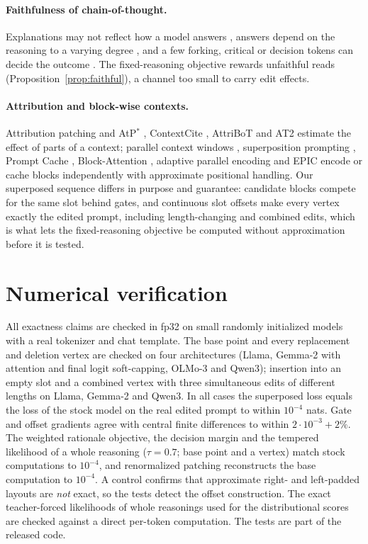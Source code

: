 \paragraph{Faithfulness of chain-of-thought.} Explanations may not reflect how a model answers
\citep{turpin2023unfaithful}, answers depend on the reasoning to a varying degree
\citep{lanham2023faithfulness}, and a few forking, critical or decision tokens can decide the outcome
\citep{bigelow2025forking,lin2024critical,shen2026decision}. The fixed-reasoning objective rewards
unfaithful reads (Proposition~\ref{prop:faithful}), a channel too small to carry edit effects.

\paragraph{Attribution and block-wise contexts.} Attribution patching and AtP$^*$ \citep{syed2024atp,kramar2024atp}, ContextCite \citep{cohenwang2024contextcite},
AttriBoT \citep{liu2025attribot} and AT2 \citep{cohenwang2025at2} estimate the effect of parts of a
context; parallel context windows \citep{ratner2023pcw}, superposition prompting
\citep{merth2024superposition}, Prompt Cache \citep{gim2024promptcache}, Block-Attention
\citep{ma2025blockattention}, adaptive parallel encoding \citep{yang2025parallel} and EPIC
\citep{hu2025epic} encode or cache blocks independently with approximate positional handling. Our
superposed sequence differs in purpose and guarantee: candidate blocks compete for the same slot
behind gates, and continuous slot offsets make every vertex exactly the edited prompt, including
length-changing and combined edits, which is what lets the fixed-reasoning objective be computed
without approximation before it is tested.

\section{Numerical verification}
\label{app:tests}
All exactness claims are checked in fp32 on small randomly initialized models with a real
tokenizer and chat template. The base point and every replacement and deletion vertex are checked
on four architectures (Llama, Gemma-2 with attention and final logit soft-capping, OLMo-3 and
Qwen3); insertion into an empty slot and a combined vertex with three simultaneous edits of
different lengths on Llama, Gemma-2 and Qwen3. In all cases the superposed loss equals the loss of
the stock model on the real edited prompt to within $10^{-4}$ nats. Gate and offset gradients
agree with central finite differences to within $2\cdot10^{-3}+2\%$. The weighted rationale
objective, the decision margin and the tempered likelihood of a whole reasoning
($\tau=0.7$; base point and a vertex) match stock computations to $10^{-4}$, and renormalized
patching reconstructs the base computation to $10^{-4}$. A control confirms that approximate
right- and left-padded layouts are \emph{not} exact, so the tests detect the offset construction.
The exact teacher-forced likelihoods of whole reasonings used for the distributional scores are checked against a
direct per-token computation. The tests are part of the released code.

